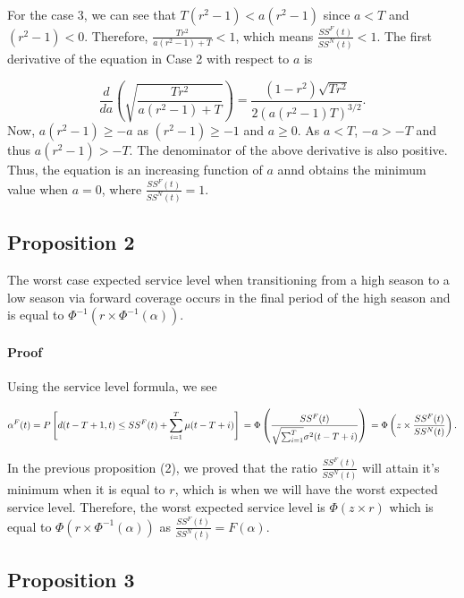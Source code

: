 \documentclass[,msom,nonblindrev]{informs}
\begin{document}
For the case 3, we can see that \(T(r^2-1) < a(r^2-1)\) since \(a<T\)
and \((r^2-1)<0\). Therefore, \(\frac{Tr^2}{a(r^2 - 1) + T}<1\), which
means \(\frac{SS^F(t)}{SS^N(t)} < 1\). The first derivative of the
equation in Case 2 with respect to \(a\) is

\[
\frac{d}{da} \left( \sqrt{\frac{Tr^2}{a(r^2 - 1) + T}}  \right) = \frac{(1-r^2) \sqrt{Tr^2}}{2(a(r^2 - 1)T)^{3/2}}.
\] Now, \(a(r^2-1) \geq -a\) as \((r^2 - 1)\geq -1\) and \(a \geq 0\).
As \(a<T\), \(-a>-T\) and thus \(a(r^2-1)>-T\). The denominator of the
above derivative is also positive. Thus, the equation is an increasing
function of \(a\) annd obtains the minimum value when \(a = 0\), where
\(\frac{SS^F(t)}{SS^N(t)} = 1\).

\hypertarget{proposition-2}{%
\subsection{Proposition 2}\label{proposition-2}}

The worst case expected service level when transitioning from a high
season to a low season via forward coverage occurs in the final period
of the high season and is equal to
\(\Phi^{-1}(r \times \Phi^{-1}(\alpha))\).

\hypertarget{proof-2}{%
\paragraph{Proof}\label{proof-2}}

Using the service level formula, we see

\[
\alpha^F(t) = P\left[ d(t-T+1, t) \leq SS^F(t) + \sum_{i = 1}^T \mu(t-T+i) \right]\\
= \Phi \left( \frac{SS^F(t)}{\sqrt{\sum_{i = 1}^T} \sigma^2(t-T+i)} \right)\\
= \Phi \left(z \times \frac{SS^F(t)}{SS^N(t)} \right).
\]

In the previous proposition (2), we proved that the ratio
\(\frac{SS^F(t)}{SS^N(t)}\) will attain it's minimum when it is equal to
\(r\), which is when we will have the worst expected service level.
Therefore, the worst expected service level is \(\Phi(z\times r)\) which
is equal to \(\Phi(r \times \Phi^{-1}(\alpha))\) as
\(\frac{SS^F(t)}{SS^N(t)} = F(\alpha)\).

\hypertarget{proposition-3}{%
\subsection{Proposition 3}\label{proposition-3}}
\end{document}
